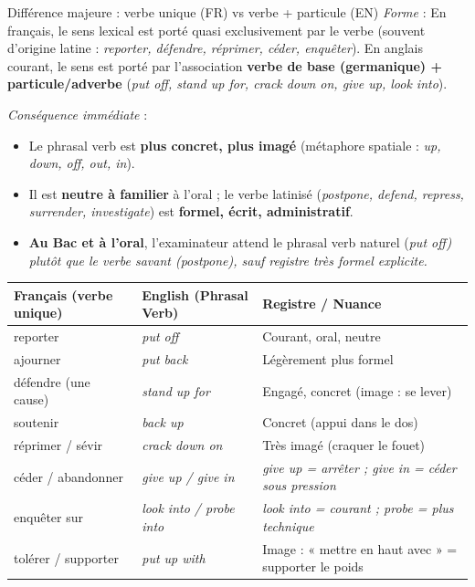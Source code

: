 \documentclass[11pt]{article}
\newcommand{\eng}[1]{\ifmmode\text{\textit{#1}}\else\begingroup\selectlanguage{english}\itshape #1\endgroup\fi}
\begin{document}
\begin{propriete}{Différence majeure : verbe unique (FR) vs verbe + particule (EN)}
\emph{Forme} : En français, le sens lexical est porté quasi exclusivement par le verbe (souvent d'origine latine : \emph{reporter, défendre, réprimer, céder, enquêter}). En anglais courant, le sens est porté par l'association \textbf{verbe de base (germanique) + particule/adverbe} (\emph{put off, stand up for, crack down on, give up, look into}).

\emph{Conséquence immédiate} : 
\begin{itemize}
    \item Le phrasal verb est \textbf{plus concret, plus imagé} (métaphore spatiale : \emph{up, down, off, out, in}).
    \item Il est \textbf{neutre à familier} à l'oral ; le verbe latinisé (\emph{postpone, defend, repress, surrender, investigate}) est \textbf{formel, écrit, administratif}.
    \item \textbf{Au Bac et à l'oral}, l'examinateur attend le phrasal verb naturel (\eng{put off}) plutôt que le verbe savant (\eng{postpone}), sauf registre très formel explicite.
\end{itemize}
\end{propriete}

\begin{center}
\begin{tabularx}{\linewidth}{|X|X|X|}
\hline
\rowcolor{popblueL} \textbf{Français (verbe unique)} & \textbf{English (Phrasal Verb)} & \textbf{Registre / Nuance} \\
\hline
reporter & \eng{put off} & Courant, oral, neutre \\
ajourner & \eng{put back} & Légèrement plus formel \\
défendre (une cause) & \eng{stand up for} & Engagé, concret (image : se lever) \\
soutenir & \eng{back up} & Concret (appui dans le dos) \\
réprimer / sévir & \eng{crack down on} & Très imagé (craquer le fouet) \\
céder / abandonner & \eng{give up} / \eng{give in} & \eng{give up} = arrêter ; \eng{give in} = céder sous pression \\
enquêter sur & \eng{look into} / \eng{probe into} & \eng{look into} = courant ; \eng{probe} = plus technique \\
tolérer / supporter & \eng{put up with} & Image : « mettre en haut avec » = supporter le poids \\
\hline
\end{tabularx}
\end{center}
\end{document}
